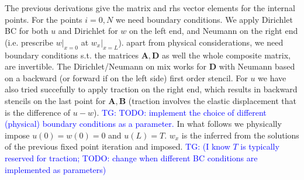 \documentclass[11pt,a4paper]{article}
\newcommand{\p}{\partial}
\newcommand{\tg}[1]{\textcolor{blue}{TG: #1} }
\newcommand{\bb}[1]{\boldsymbol{#1}}
\begin{document}
The previous derivations give the matrix and rhs vector elements for the internal points. For the points $i=0,N$ we need boundary conditions. We apply Dirichlet BC for both $u$ and Dirichlet for $w$ on the left end, and Neumann on the right end (i.e. prescribe $w|_{x=0}$ at $w_x|_{x=L}$). apart from physical considerations, we need boundary conditions s.t. the matrices $\bb{A},\bb{D}$ as well the whole composite matrix, are invertible. The Dirichlet/Neumann on mix works for $\bb{D}$ with Neumann based on a backward (or forward if on the left side) first order stencil. For $u$ we have also tried succefully to apply traction on the right end, which results in backward stencils on the last point for $\bb{A},\bb{B}$ (traction involves the elastic displacement that is the difference of $u-w$).
%
\tg{TODO: implement the choice of different (physical) boundary conditions as a parameter.}
In what follows we physically impose $u(0) = w(0) = 0$ and $u(L) = T$. $w_x$ is the inferred from the solutions of the previous fixed point iteration and imposed.
%
\tg{(I know $T$ is typically reserved for traction; TODO: change when different BC conditions are implemented as parameters)}

\end{document}
